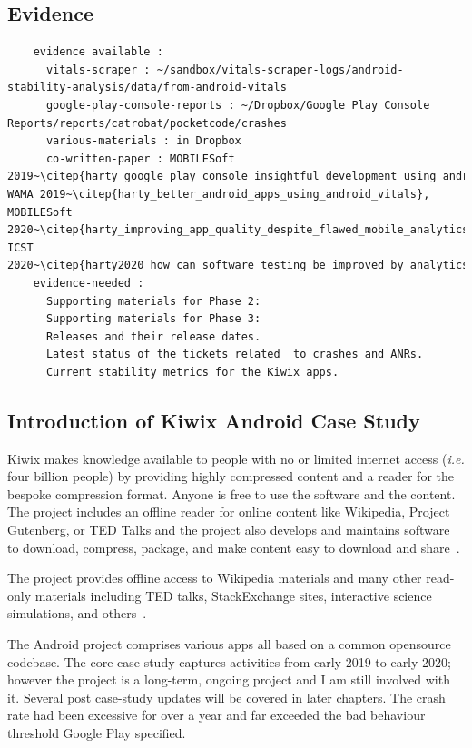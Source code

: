 \subsection*{Evidence}
  \begin{verbatim}
    evidence available :
      vitals-scraper : ~/sandbox/vitals-scraper-logs/android-stability-analysis/data/from-android-vitals
      google-play-console-reports : ~/Dropbox/Google Play Console Reports/reports/catrobat/pocketcode/crashes
      various-materials : in Dropbox
      co-written-paper : MOBILESoft 2019~\citep{harty_google_play_console_insightful_development_using_android_vitals_and_pre_launch_reports}, WAMA 2019~\citep{harty_better_android_apps_using_android_vitals}, MOBILESoft 2020~\citep{harty_improving_app_quality_despite_flawed_mobile_analytics}, ICST 2020~\citep{harty2020_how_can_software_testing_be_improved_by_analytics_to_deliver_better_apps}.
    evidence-needed : 
      Supporting materials for Phase 2:
      Supporting materials for Phase 3: 
      Releases and their release dates.
      Latest status of the tickets related  to crashes and ANRs.
      Current stability metrics for the Kiwix apps.
  \end{verbatim}

\subsection{Introduction of Kiwix Android Case Study}
Kiwix makes knowledge available to people with no or limited internet access (\emph{i.e.} four billion people) by providing highly compressed content and a reader for the bespoke compression format. Anyone is free to use the software and the content. The project includes an offline reader for online content like Wikipedia, Project Gutenberg, or TED Talks and the project also develops and maintains software to download, compress, package, and make content easy to download and share~\citep{kiwix_about_the_project, gomez2017_wikimedia_kiwix_article}.

The project provides offline access to Wikipedia materials and many other read-only materials including TED talks, StackExchange sites, interactive science simulations, and others~\citep{kiwix_about_the_project, gomez2017_wikimedia_kiwix_article}. 

The Android project comprises various apps all based on a common opensource codebase. The core case study captures activities from early 2019 to early 2020; however the project is a long-term, ongoing project and I am still involved with it. Several post case-study updates will be covered in later chapters. The crash rate had been excessive for over a year and far exceeded the bad behaviour threshold Google Play specified. 

